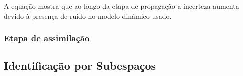A equação mostra que ao longo da etapa de propagação a incerteza aumenta devido à presença de ruído no modelo dinâmico usado.

\subsubsection{Etapa de assimilação}


\subsection {Identificação por Subespaços}

















